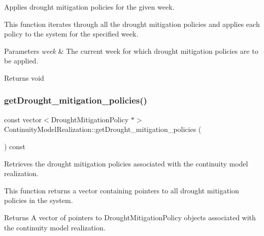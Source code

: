 Applies drought mitigation policies for the given week. 

This function iterates through all the drought mitigation policies and applies each policy to the system for the specified week.


\begin{DoxyParams}{Parameters}
{\em week} & The current week for which drought mitigation policies are to be applied.\\
\hline
\end{DoxyParams}
\begin{DoxyReturn}{Returns}
void 
\end{DoxyReturn}
\mbox{\label{classContinuityModelRealization_afadb3e7f51ae7a09948ffc73d7eb7f6b}} 
\subsubsection{\texorpdfstring{get\+Drought\+\_\+mitigation\+\_\+policies()}{getDrought\_mitigation\_policies()}}
{\footnotesize\ttfamily const vector$<$Drought\+Mitigation\+Policy $\ast$$>$ Continuity\+Model\+Realization\+::get\+Drought\+\_\+mitigation\+\_\+policies (\begin{DoxyParamCaption}{ }\end{DoxyParamCaption}) const}



Retrieves the drought mitigation policies associated with the continuity model realization. 

This function returns a vector containing pointers to all drought mitigation policies in the system.

\begin{DoxyReturn}{Returns}
A {\ttfamily vector} of pointers to {\ttfamily Drought\+Mitigation\+Policy} objects associated with the continuity model realization. 
\end{DoxyReturn}
\mbox{\label{classContinuityModelRealization_a5b9405156e8cc21c8781ea15ee46c8fe}} 
